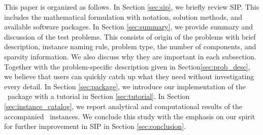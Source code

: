
This paper is organized as follows. In Section \ref{sec:sip}, we briefly review SIP. This 
includes the mathematical formulation with notation, solution methods, and available software 
packages. In Section \ref{sec:summary}, we provide summary and discussion of the test 
problems. This consists of origin of the problems with brief description, instance naming 
rule, problem type, the number of components, and sparsity information. We also discuss why 
they are important in each subsection. Together with the problem-specific description given 
in Section\ref{sec:prob_desc}, we believe that users can quickly catch up what they need 
without investigating every detail. In Section \ref{sec:package}, we introduce our 
implementation of the \julia\ package with a tutorial in Section 
\ref{sec:tutorial}. In Section \ref{sec:instance_catalog}, we report analytical and 
computational results of the accompanied \smps\ instances. We conclude this study with the 
emphasis on our spirit for further improvement in SIP in Section \ref{sec:conclusion}. 







